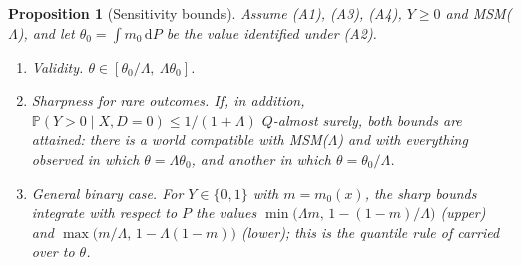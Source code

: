 \documentclass[11pt,a4paper]{article}
\newcommand{\PP}{\mathbb{P}}
\newcommand{\dd}{\,\mathrm{d}}
\theoremstyle{plain}
\newtheorem{proposition}{Proposition}
\theoremstyle{definition}
\begin{document}
\begin{proposition}[Sensitivity bounds]\label{prop:sensitivity}
Assume (A1), (A3), (A4), $Y\ge0$ and MSM($\Lambda$), and let $\theta_0=\int m_0\dd P$ be the value identified under (A2).
\begin{enumerate}
  \item \emph{Validity.} $\theta\in[\theta_0/\Lambda,\ \Lambda\theta_0]$.
  \item \emph{Sharpness for rare outcomes.} If, in addition, $\PP(Y>0\mid X,D=0)\le1/(1+\Lambda)$ $Q$-almost surely, both bounds are attained: there is a world compatible with MSM($\Lambda$) and with everything observed in which $\theta=\Lambda\theta_0$, and another in which $\theta=\theta_0/\Lambda$.
  \item \emph{General binary case.} For $Y\in\{0,1\}$ with $m=m_0(x)$, the sharp bounds integrate with respect to $P$ the values $\min\bigl(\Lambda m,\,1-(1-m)/\Lambda\bigr)$ (upper) and $\max\bigl(m/\Lambda,\,1-\Lambda(1-m)\bigr)$ (lower); this is the quantile rule of \citet{dorn2023} carried over to $\theta$.
\end{enumerate}
\end{proposition}
\end{document}
